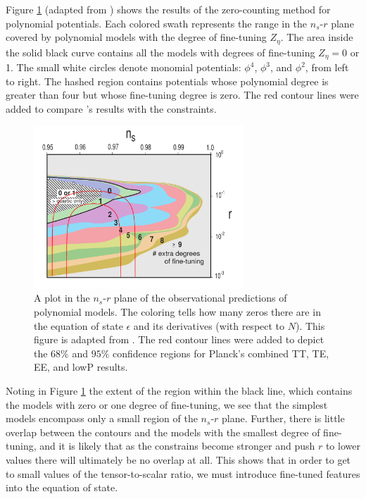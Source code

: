 \documentclass[a4paper,11pt]{article}
\def\nsr{$n_s$-$r$ }
\begin{document}
Figure \ref{fig:Latham} (adapted from \citet{Boyle+2006}) shows the results of the zero-counting method for polynomial potentials. Each colored swath represents the range in the \nsr plane covered by polynomial models with the degree of fine-tuning $Z_{\eta}$. The area inside the solid black curve contains all the models with degrees of fine-tuning $Z_{\eta}=0$ or 1. The small white circles denote monomial potentials: $\phi^4$, $\phi^3$, and $\phi^2$, from left to right. The hashed region contains potentials whose polynomial degree is greater than four but whose fine-tuning degree is zero. The red contour lines were added to compare \citet{Boyle+2006}'s results with the \citet{Planck2015} constraints. 

\begin{figure}[H]
	\centering
	\includegraphics[width=0.7\textwidth]{figures/LathamFigurePlanck.pdf}
	\caption[Plot of \nsr coverage of polynomial models showing fine-tuning]{A plot in the \nsr plane of the observational predictions of polynomial models. The coloring tells how many zeros there are in the equation of state $\epsilon$ and its derivatives (with respect to $N$). This figure is adapted from \citet{Boyle+2006}. The red contour lines were added to depict the $68\%$ and $95\%$ confidence regions for Planck's combined TT, TE, EE, and lowP results.}
	\label{fig:Latham}
\end{figure}

Noting in Figure \ref{fig:Latham} the extent of the region within the black line, which contains the models with zero or one degree of fine-tuning, we see that the simplest models encompass only a small region of the \nsr plane. Further, there is little overlap between the \citet{Planck2015} contours and the models with the smallest degree of fine-tuning, and it is likely that as the constrains become stronger and push $r$ to lower values there will ultimately be no overlap at all. This shows that in order to get to small values of the tensor-to-scalar ratio, we must introduce fine-tuned features into the equation of state. 
\end{document}
